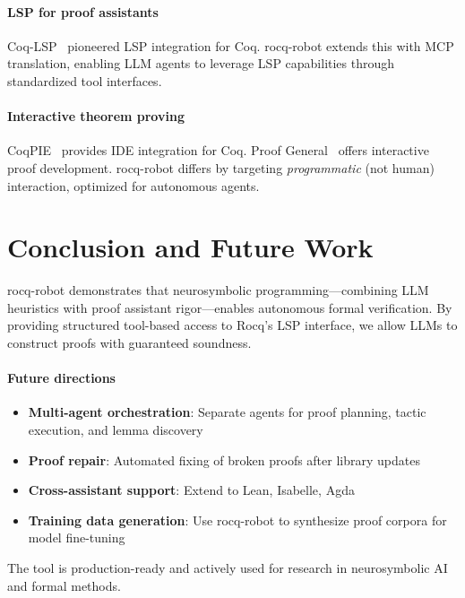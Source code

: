 \documentclass[sigconf,screen,nonacm]{acmart}
\begin{document}
\paragraph{LSP for proof assistants}
Coq-LSP~\cite{gallego2022coqlsp} pioneered LSP integration for Coq. rocq-robot extends this with MCP translation, enabling LLM agents to leverage LSP capabilities through standardized tool interfaces.

\paragraph{Interactive theorem proving}
CoqPIE~\cite{roe2016coqpie} provides IDE integration for Coq. Proof General~\cite{aspinall2000proof} offers interactive proof development. rocq-robot differs by targeting \emph{programmatic} (not human) interaction, optimized for autonomous agents.

\section{Conclusion and Future Work}

rocq-robot demonstrates that neurosymbolic programming—combining LLM heuristics with proof assistant rigor—enables autonomous formal verification. By providing structured tool-based access to Rocq's LSP interface, we allow LLMs to construct proofs with guaranteed soundness.

\paragraph{Future directions}
\begin{itemize}
\item \textbf{Multi-agent orchestration}: Separate agents for proof planning, tactic execution, and lemma discovery
\item \textbf{Proof repair}: Automated fixing of broken proofs after library updates
\item \textbf{Cross-assistant support}: Extend to Lean, Isabelle, Agda
\item \textbf{Training data generation}: Use rocq-robot to synthesize proof corpora for model fine-tuning
\end{itemize}

The tool is production-ready and actively used for research in neurosymbolic AI and formal methods.
\end{document}
